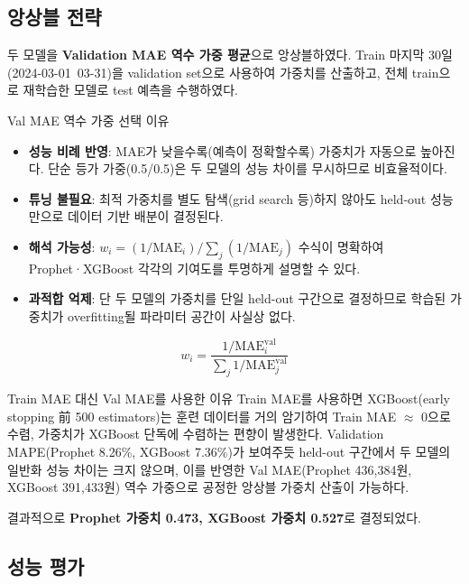 \documentclass[a4paper, 11pt]{article}
\begin{document}
\subsection{앙상블 전략}

두 모델을 \textbf{Validation MAE 역수 가중 평균}으로 앙상블하였다.
Train 마지막 30일(2024-03-01~03-31)을 validation set으로 사용하여 가중치를 산출하고,
전체 train으로 재학습한 모델로 test 예측을 수행하였다.

\begin{infobox}{Val MAE 역수 가중 선택 이유}
\begin{itemize}[noitemsep, topsep=2pt]
  \item \textbf{성능 비례 반영}: MAE가 낮을수록(예측이 정확할수록) 가중치가 자동으로 높아진다.
        단순 등가 가중(0.5/0.5)은 두 모델의 성능 차이를 무시하므로 비효율적이다.
  \item \textbf{튜닝 불필요}: 최적 가중치를 별도 탐색(grid search 등)하지 않아도
        held-out 성능만으로 데이터 기반 배분이 결정된다.
  \item \textbf{해석 가능성}: $w_i = (1/\mathrm{MAE}_i) / \sum_j (1/\mathrm{MAE}_j)$ 수식이 명확하여
        Prophet·XGBoost 각각의 기여도를 투명하게 설명할 수 있다.
  \item \textbf{과적합 억제}: 단 두 모델의 가중치를 단일 held-out 구간으로 결정하므로
        학습된 가중치가 overfitting될 파라미터 공간이 사실상 없다.
\end{itemize}
\end{infobox}

\[
  w_i = \frac{1 / \mathrm{MAE}_i^{\text{val}}}{\displaystyle\sum_j 1 / \mathrm{MAE}_j^{\text{val}}}
\]

\begin{warnbox}{Train MAE 대신 Val MAE를 사용한 이유}
Train MAE를 사용하면 XGBoost(early stopping 前 500 estimators)는 훈련 데이터를 거의
암기하여 Train MAE $\approx$ 0으로 수렴, 가중치가 XGBoost 단독에 수렴하는 편향이 발생한다.
Validation MAPE(Prophet 8.26\%, XGBoost 7.36\%)가 보여주듯
held-out 구간에서 두 모델의 일반화 성능 차이는 크지 않으며,
이를 반영한 Val MAE(Prophet 436,384원, XGBoost 391,433원) 역수 가중으로
공정한 앙상블 가중치 산출이 가능하다.
\end{warnbox}

결과적으로 \textbf{Prophet 가중치 0.473, XGBoost 가중치 0.527}로 결정되었다.

\subsection{성능 평가}
\end{document}
